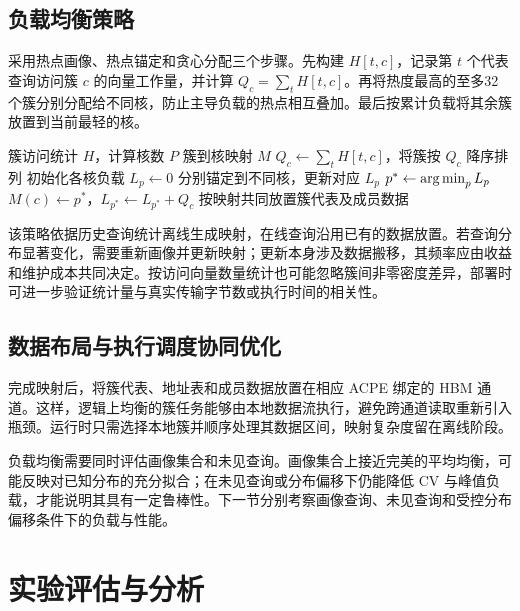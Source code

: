 

\subsection{\texorpdfstring{\hbalance{}}{H2Balance} 负载均衡策略}
\hbalance{}采用热点画像、热点锚定和贪心分配三个步骤。先构建 $H[t,c]$，记录第 $t$ 个代表查询访问簇 $c$ 的向量工作量，并计算 $Q_c=\sum_tH[t,c]$。再将热度最高的至多32 个簇分别分配给不同核，防止主导负载的热点相互叠加。最后按累计负载将其余簇放置到当前最轻的核。
\begin{algorithm}[htbp]\caption{基于代表查询的分层热点均衡}\label{alg:hbalance}
\begin{algorithmic}[1]
\REQUIRE 簇访问统计 $H$，计算核数 $P$
\ENSURE 簇到核映射 $M$
\STATE $Q_c\leftarrow\sum_tH[t,c]$，将簇按 $Q_c$ 降序排列
\STATE 初始化各核负载 $L_p\leftarrow0$
\STATE 分别锚定到不同核，更新对应 $L_p$
\ENDFOR
{}
\STATE $p^*\leftarrow\operatorname*{arg\,min}_pL_p$
\STATE $M(c)\leftarrow p^*$，$L_{p^*}\leftarrow L_{p^*}+Q_c$
\ENDFOR
\STATE 按映射共同放置簇代表及成员数据
\end{algorithmic}\end{algorithm}

该策略依据历史查询统计离线生成映射，在线查询沿用已有的数据放置。若查询分布显著变化，需要重新画像并更新映射；更新本身涉及数据搬移，其频率应由收益和维护成本共同决定。按访问向量数量统计也可能忽略簇间非零密度差异，部署时可进一步验证统计量与真实传输字节数或执行时间的相关性。

\subsection{数据布局与执行调度协同优化}
完成映射后，将簇代表、地址表和成员数据放置在相应 ACPE 绑定的 HBM 通道。这样，逻辑上均衡的簇任务能够由本地数据流执行，避免跨通道读取重新引入瓶颈。运行时只需选择本地簇并顺序处理其数据区间，映射复杂度留在离线阶段。

负载均衡需要同时评估画像集合和未见查询。画像集合上接近完美的平均均衡，可能反映对已知分布的充分拟合；在未见查询或分布偏移下仍能降低 CV 与峰值负载，才能说明其具有一定鲁棒性。下一节分别考察画像查询、未见查询和受控分布偏移条件下的负载与性能。

\section{实验评估与分析}
